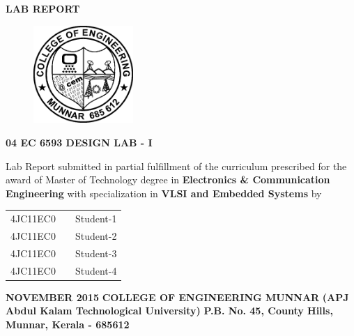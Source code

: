 \begin{titlepage}
\thispagestyle{empty}\centering
\newlength{\toptafiddle} 
\newlength{\bottafiddle}

\setlength{\toptafiddle}{1in}
\setlength{\bottafiddle}{1in}
\vspace*{-0.75in}
\enlargethispage{\toptafiddle}
\textbf{\HUGE LAB REPORT}\vfill %


\vspace{0.2cm}
\begin{figure}[h]
\centering
\includegraphics[height=3.7cm]{images/cem1.png}
\end{figure}

\vfill

\Huge{\textbf{04 EC 6593 DESIGN LAB - I}}
\vfill

\large Lab Report  submitted in partial fulfillment of the curriculum
prescribed for the award  of Master of Technology degree
in \vfill \textbf{\Large Electronics \& Communication Engineering}  \vfill with specialization in \vfill
\textbf{\Large VLSI and Embedded Systems} \vfill by\vfill


\begin{tabular}{ccc}
4JC11EC0 &  & Student-1\\
4JC11EC0 &  & Student-2\\
4JC11EC0 &  & Student-3\\
4JC11EC0 &  & Student-4\\
\end{tabular}
\vfill
%
%


\vfill

\textbf{\large NOVEMBER 2015}\vfill
 \textbf{\Large COLLEGE OF ENGINEERING MUNNAR} \vfill
 \textbf{\Large (APJ Abdul Kalam Technological University)} \vfill
 \textbf{\large P.B. No. 45, County Hills, %
 Munnar, Kerala - 685612} \vfill
\end{titlepage}
